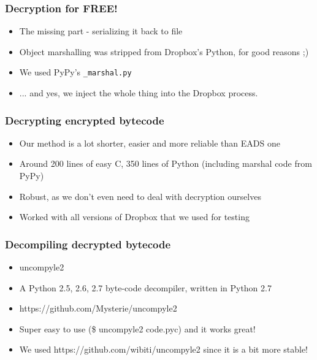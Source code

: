\documentclass{beamer}
\newcommand\myfont{\fontsize{14}{20}\selectfont}
\begin{document}
\begin{frame}
\frametitle{Decryption for FREE!}
\myfont
\begin{itemize}
\itemsep 1.5em
\item{The missing part - serializing it back to file }
\item{Object marshalling was stripped from Dropbox's Python, for good reasons ;)}
\item{We used PyPy's \texttt{\_marshal.py}}
\item{... and yes, we inject the whole thing into the Dropbox process.}
\end{itemize}
\end{frame}

\begin{frame}
\frametitle{Decrypting encrypted bytecode}
\myfont
\begin{itemize}
\itemsep 1em
\item{Our method is a lot shorter, easier and more reliable than EADS one}
\item{Around 200 lines of easy C, 350 lines of Python (including marshal code from PyPy)}
\item{Robust, as we don't even need to deal with decryption ourselves}
\item{Worked with all versions of Dropbox that we used for testing}
\end{itemize}
\end{frame}


\begin{frame}
\frametitle{Decompiling decrypted bytecode}
\begin{itemize}
\itemsep 2em
\item uncompyle2

\item A Python 2.5, 2.6, 2.7 byte-code decompiler, written in Python 2.7

\item https://github.com/Mysterie/uncompyle2

\item Super easy to use (\$ uncompyle2 code.pyc) and it works great!

\item We used https://github.com/wibiti/uncompyle2 since it is a bit more stable!
\end{itemize}
\end{frame}
\end{document}
